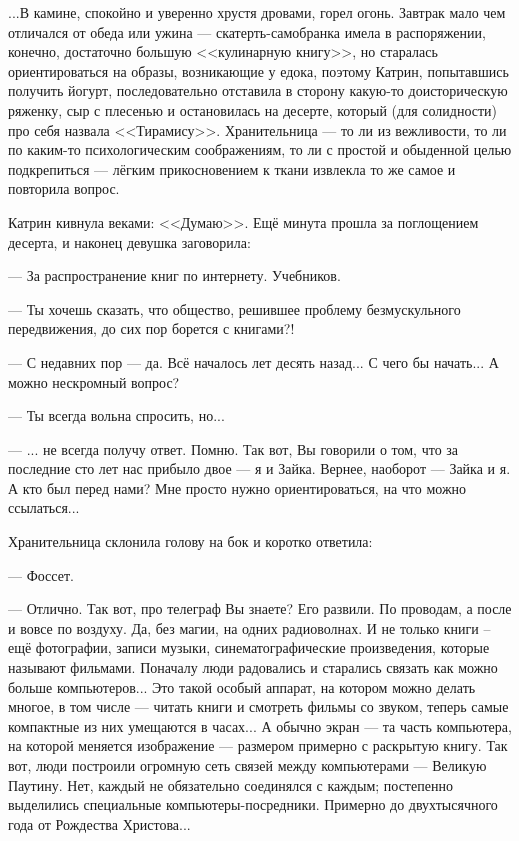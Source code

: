 ...В камине, спокойно и уверенно хрустя дровами, горел огонь. Завтрак мало чем отличался от обеда или ужина ---
скатерть-самобранка имела в распоряжении, конечно, достаточно большую <<кулинарную книгу>>,
но старалась ориентироваться на образы, возникающие у едока, поэтому Катрин, попытавшись получить йогурт,
последовательно отставила в сторону какую-то доисторическую ряженку, сыр с плесенью и остановилась на десерте,
который (для солидности) про себя назвала <<Тирамису>>.
Хранительница --- то ли из вежливости, то ли по каким-то психологическим соображениям,
то ли с простой и обыденной целью подкрепиться --- лёгким прикосновением к ткани извлекла то же самое и повторила вопрос.

Катрин кивнула веками: <<Думаю>>.
Ещё минута прошла за поглощением десерта, и наконец девушка заговорила:

--- За распространение книг по интернету. Учебников.

--- Ты хочешь сказать, что общество, решившее проблему безмускульного передвижения, до сих пор борется с книгами?!

--- С недавних пор --- да. Всё началось лет десять назад... С чего бы начать... А можно нескромный вопрос?

--- Ты всегда вольна спросить, но...

--- ... не всегда получу ответ. Помню. Так вот, Вы говорили о том, что за последние сто лет нас прибыло двое --- я и Зайка.
Вернее, наоборот --- Зайка и я. А кто был перед нами? Мне просто нужно ориентироваться, на что можно ссылаться...

Хранительница склонила голову на бок и коротко ответила:

--- Фоссет.

--- Отлично. Так вот, про телеграф Вы знаете? Его развили. По проводам, а после и вовсе по воздуху.
Да, без магии, на одних радиоволнах.
И не только книги -- ещё фотографии, записи музыки, синематографические произведения, которые называют фильмами.
Поначалу люди радовались и старались связать как можно больше компьютеров...
Это такой особый аппарат, на котором можно делать многое, в том числе --- читать книги и смотреть фильмы со звуком,
теперь самые компактные из них умещаются в часах...
А обычно экран --- та часть компьютера, на которой меняется изображение --- размером примерно с раскрытую книгу.
Так вот, люди построили огромную сеть связей между компьютерами --- Великую Паутину.
Нет, каждый не обязательно соединялся с каждым; постепенно выделились специальные компьютеры-посредники.
Примерно до двухтысячного года от Рождества Христова...

